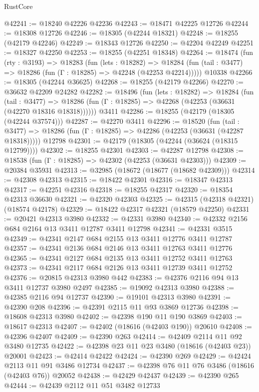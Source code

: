 \begin{lexlean}{RustCore}
\begin{coremodule}
@42241 := @18240 @42226 @42236
@42243 := @18471 @42225 @12726
@42244 := @18308 @12726
@42246 := @18305 (@42244 @18321)
@42248 := @18255 (@42179 @42246)
@42249 := @18343 @12726
@42250 := @42204 @42249
@42251 := @18327 @42250
@42253 := @18255 (@42251 @18348)
@42264 := @18474
    (fun (rty : @3193) =>
    @18283
      (fun (lets : @18282) =>
      @18284 (fun (tail : @3477) => @18286 (fun (Γ : @18285) => @42248 (@42253 @42214)))))
    @10338
@42266 := @18305 (@42244 @36625)
@42268 := @18255 (@42179 @42266)
@42270 := @36632 @42209 @24282
@42282 := @18496
    (fun (lets : @18282) =>
    @18284
      (fun (tail : @3477) =>
      @18286 (fun (Γ : @18285) => @42268 (@42253 (@36631 (@42270 @18316 @18318))))))
    @3411
@42286 := @18255 (@42179 (@18305 (@42244 @37574)))
@42287 := @42270 @3411
@42296 := @18520
    (fun (tail : @3477) => @18286 (fun (Γ : @18285) => @42286 (@42253 (@36631 (@42287 @18318)))))
    @12798
@42301 := @42179 (@18305 (@42244 (@36624 (@18315 @12799))))
@42302 := @18255 @42301
@42303 := @42287 @12798
@42308 := @18538 (fun (Γ : @18285) => @42302 (@42253 (@36631 @42303)))
@42309 := @20384 @35931
@42313 := @32985 (@18672 (@18677 (@18682 @42309)))
@42314 := @42308 @42313
@42315 := @18422 @42301
@42316 := @18347 @42313
@42317 := @42251 @42316
@42318 := @18255 @42317
@42320 := @18354 @42313 @36630
@42321 := @42320 @42303
@42325 := @42315 (@42318 @42321) (@18574 @42178)
@42329 := @18422 @42317 @42321 (@18579 @42250)
@42331 := @20421 @42313 @3980
@42332 := @42331 @3980
@42340 := @42332 @2156 @684 @2164 @13 @3411 @12787 @3411 @12798
@42341 := @42331 @3515
@42349 := @42341 @2147 @684 @2155 @13 @3411 @12776 @3411 @12787
@42357 := @42341 @2136 @684 @2146 @13 @3411 @12763 @3411 @12776
@42365 := @42341 @2127 @684 @2135 @13 @3411 @12752 @3411 @12763
@42373 := @42341 @2117 @684 @2126 @13 @3411 @12739 @3411 @12752
@42376 := @20815 @42313 @3980 @442
@42383 := @42376 @2116 @94 @13 @3411 @12737 @3980 @2497
@42385 := @19092 @42313 @3980
@42388 := @42385 @2116 @94 @12737
@42390 := @19101 @42313 @3980
@42391 := @42390 @208
@42396 := @42391 @2115 @11 @93 @3869 @12736
@42398 := @18608 @42313 @3980
@42402 := @42398 @190 @11 @190 @3869
@42403 := @18617 @42313
@42407 := @42402 (@18616 (@42403 @190)) @20610
@42408 := @42396 @42407
@42409 := @42390 @263
@42414 := @42409 @2114 @11 @92 @3480 @12735
@42422 := @42398 @23 @11 @23 @3480 (@18616 (@42403 @23)) @20001
@42423 := @42414 @42422
@42424 := @42390 @269
@42429 := @42424 @2113 @11 @91 @3486 @12734
@42437 := @42398 @76 @11 @76 @3486 (@18616 (@42403 @76)) @20052
@42438 := @42429 @42437
@42439 := @42390 @265
@42444 := @42439 @2112 @11 @51 @3482 @12733

\end{coremodule}
\end{lexlean}
